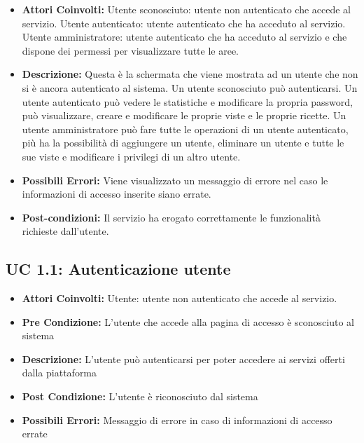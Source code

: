 \begin{itemize}

\item \textbf{Attori Coinvolti:}
Utente sconosciuto: utente non autenticato che accede al servizio.
Utente autenticato: utente autenticato che ha acceduto al servizio.
Utente amministratore: utente autenticato che ha acceduto al servizio e che dispone dei permessi per visualizzare tutte le aree.

\item \textbf{Descrizione:}
Questa è la schermata che viene mostrata ad un utente che non si è ancora autenticato al sistema.
Un utente sconosciuto può autenticarsi. 
Un utente autenticato può vedere le statistiche e modificare la propria password, può visualizzare, creare e modificare le proprie viste e le proprie ricette. 
Un utente amministratore può fare tutte le operazioni di un utente autenticato, più ha la possibilità di aggiungere un utente, eliminare un utente e tutte le sue viste e modificare i privilegi di un altro utente.

\item \textbf{Possibili Errori:}
Viene visualizzato un messaggio di errore nel caso le informazioni di accesso inserite siano errate.

\item \textbf{Post-condizioni:}
Il servizio ha erogato correttamente le funzionalità richieste dall'utente.

\end{itemize}

\subsection{UC 1.1: Autenticazione utente}

\begin{itemize}

\item \textbf{Attori Coinvolti:}
Utente: utente non autenticato che accede al servizio.

\item \textbf{Pre Condizione:}
L’utente che accede alla pagina di accesso è sconosciuto al sistema

\item \textbf{Descrizione:}
L’utente può autenticarsi per poter accedere ai servizi offerti dalla piattaforma

\item \textbf{Post Condizione:}
L’utente è riconosciuto dal sistema

\item \textbf{Possibili Errori:}
Messaggio di errore in caso di informazioni di accesso errate

\end{itemize}

